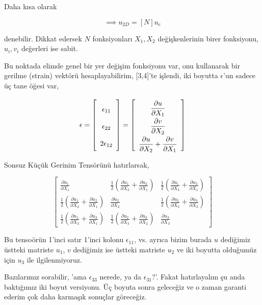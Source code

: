 \documentclass[12pt,fleqn]{article}\usepackage{../../common}
\begin{document}
Daha kısa olarak

$$
\implies u_{2D} = [N] u_e
$$

denebilir. Dikkat edersek $N$ fonksiyonları $X_1,X_2$ değişkenlerinin
birer fonksiyonu, $u_i,v_i$ değerleri ise sabit.

Bu noktada elimde genel bir yer değişim fonksiyonu var, onu kullanarak bir
gerilme (strain) vektörü hesaplayabilirim, [3,4]'te işlendi, iki boyutta
$\epsilon$'un sadece üç tane öğesi var,

$$
\epsilon = \left[\begin{array}{c}
\epsilon_{11} \\ \epsilon_{22} \\ 2 \epsilon_{12} 
\end{array}\right]
\renewcommand*{\arraystretch}{2.0}
= \left[\begin{array}{c}
\dfrac{\partial u}{\partial X_1} \\
\dfrac{\partial v}{\partial X_2} \\
\dfrac{\partial u}{\partial X_2} + \dfrac{\partial v}{\partial X_1} 
\end{array}\right]
$$

Sonsuz Küçük Gerinim Tensörünü hatırlarsak,

$$
\left[\begin{array}{ccc}
  \frac{\partial u_1}{\partial X_1} &
  \frac{1}{2}(\frac{\partial u_1}{\partial X_2} + \frac{\partial u_2}{\partial X_1} ) & 
  \frac{1}{2}(\frac{\partial u_1}{\partial X_3} + \frac{\partial u_3}{\partial  X_1} )
\\
  \frac{1}{2}(\frac{\partial u_1}{\partial X_2} + \frac{\partial u_2}{\partial X_1} ) &
  \frac{\partial u_2}{\partial X_2} &
  \frac{1}{2}(\frac{\partial u_2}{\partial X_3} + \frac{\partial u_3}{\partial X_2} )
\\
  \frac{1}{2}(\frac{\partial u_1}{\partial X_3} + \frac{\partial u_3}{\partial X_1} ) &
  \frac{1}{2}(\frac{\partial u_2}{\partial X_3} + \frac{\partial u_3}{\partial X_2} ) &
  \frac{\partial u_3}{\partial X_3} 
\end{array}\right]
$$

Bu tensoörün 1'inci satır 1'inci kolonu $\epsilon_{11}$, vs. ayrıca bizim burada
$u$ dediğimiz üstteki matriste $u_1$, $v$ dediğimiz ise üstteki matriste $u_2$
ve iki boyutta olduğumüz için $u_3$ ile ilgilenmiyoruz.

Bazılarımız sorabilir, 'ama $\epsilon_{33}$ nerede, ya da $\epsilon_{31}$?'.
Fakat hatırlayalım şu anda baktığımız iki boyut versiyonu. Üç boyuta sonra
geleceğiz ve o zaman garanti ederim çok daha karmaşık sonuçlar göreceğiz. 
\end{document}
